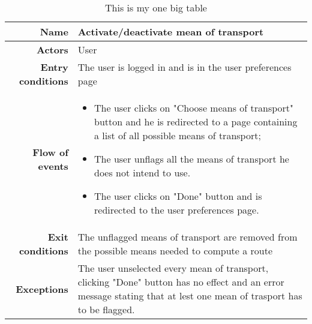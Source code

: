 \begin{table}[htp]
\begin{tabular}{r|p{7cm}}
\bf\large Name&\bf\large Activate/deactivate mean of transport\\
\hline
\hline
\bf Actors&User\\
\hline
\bf Entry conditions&The user is logged in and is in the user preferences page\\
\hline
\bf Flow of events&
\begin{itemize}
\item The user clicks on "Choose means of transport" button and he is redirected to a page containing a list of all possible means of transport;
\item  The user unflags all the means of transport he does not intend to use.
\item  The user clicks on "Done" button and is redirected to the user preferences page.
\end{itemize}
\\
\hline
\bf Exit conditions&The unflagged means of transport are removed from the possible means needed to compute a route\\
\hline
\bf Exceptions&The user unselected every mean of transport, clicking "Done" button has no effect and an error message stating that at lest one mean of trasport has to be flagged.
\\
\hline

\end{tabular}
\caption{This is my one big table} \label{tab:activatedeactivatemean}
\end{table}